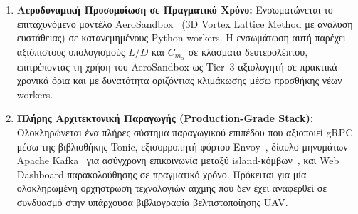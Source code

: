 \begin{enumerate}
    \item \textbf{Αεροδυναμική Προσομοίωση σε Πραγματικό Χρόνο:}
    Ενσωματώνεται το επιταχυνόμενο μοντέλο AeroSandbox~\cite{sharpe2021aerosandbox,sharpe2022aiaa} (3D Vortex Lattice Method με ανάλυση ευστάθειας) σε κατανεμημένους Python workers. Η ενσωμάτωση αυτή παρέχει αξιόπιστους υπολογισμούς $L/D$ και $C_{m_\alpha}$ σε κλάσματα δευτερολέπτου, επιτρέποντας τη χρήση του AeroSandbox ως Tier~3 αξιολογητή σε πρακτικά χρονικά όρια και με δυνατότητα οριζόντιας κλιμάκωσης μέσω προσθήκης νέων workers.

    \item \textbf{Πλήρης Αρχιτεκτονική Παραγωγής (Production-Grade Stack):}
    Ολοκληρώνεται ένα πλήρες σύστημα παραγωγικού επιπέδου που αξιοποιεί gRPC μέσω της βιβλιοθήκης Tonic, εξισορροπητή φόρτου Envoy~\cite{klein2017envoy}, δίαυλο μηνυμάτων Apache Kafka~\cite{kreps2011kafka} για ασύγχρονη επικοινωνία μεταξύ island-κόμβων~\cite{whitley1999island,alba1999survey}, και Web Dashboard παρακολούθησης σε πραγματικό χρόνο. Πρόκειται για μία ολοκληρωμένη ορχήστρωση τεχνολογιών αιχμής που δεν έχει αναφερθεί σε συνδυασμό στην υπάρχουσα βιβλιογραφία βελτιστοποίησης UAV.
\end{enumerate}

